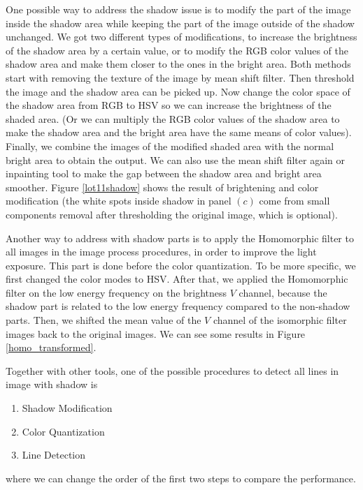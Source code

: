 \documentclass{m2pi}
\begin{document}
One possible way to address the shadow issue is to modify the part of the image inside the shadow area while keeping the part of the image outside of the shadow unchanged. We got two different types of modifications, to increase the brightness of the shadow area by a certain value, or to modify the RGB color values of the shadow area and make them closer to the ones in the bright area. Both methods start with 
removing the texture of the image by mean shift filter. Then threshold the image and the shadow area can be picked up. Now change the color space of the shadow area from RGB to HSV so we can increase the brightness of the shaded area. (Or we can multiply the RGB color values of the shadow area to make the shadow area and the bright area have the same means of color values). Finally, we combine the images of the modified shaded area with the normal bright area to obtain the output. We can also use the mean shift filter again or inpainting tool to make the gap between the shadow area and bright area smoother. Figure \ref{lot11shadow} shows the result of brightening and color modification (the white spots inside shadow in panel $(c)$ come from small components removal after thresholding the original image, which is optional).

Another way to address with shadow parts is to apply the Homomorphic filter \cite{glasgio} to all images in the image process procedures, in order to improve the light exposure. This part is done before the color quantization. To be more specific, we first changed the color modes to HSV.
After that, we applied the Homomorphic filter on the low energy frequency on the brightness $V$ channel, because the shadow part is related to the low energy frequency compared to the non-shadow parts. Then, we shifted the mean value of the $V$ channel of the isomorphic filter images back to the original images.   We can see some results in Figure \ref{homo_transformed}. 

Together with other tools, one of the possible procedures to detect all lines in image with shadow is
\begin{enumerate}
    \item Shadow Modification
    \item Color Quantization
    \item Line Detection
\end{enumerate}
where we can change the order of the first two steps to compare the performance.
\end{document}
